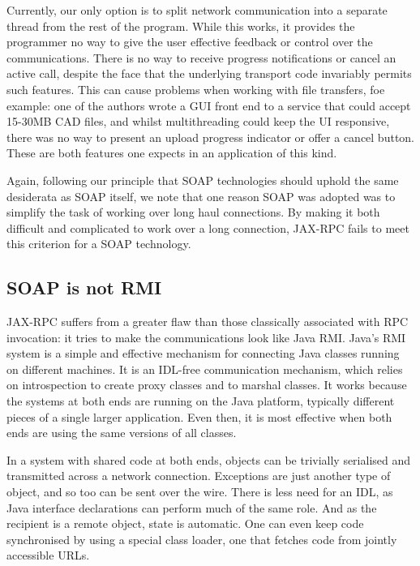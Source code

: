 Currently, our only option is to split network communication into a
separate thread from the rest of the program. While this works, it
provides the programmer no way to give the user effective feedback or
control over the communications. There is no way to receive progress
notifications or cancel an active call, despite the face that the
underlying transport code invariably permits such features. This can
cause problems when working with file transfers, foe example: one of
the authors wrote a GUI front end to a service that could accept
15-30MB CAD files, and whilst multithreading could keep the UI
responsive, there was no way to present an upload progress indicator
or offer a cancel button. These are both features one expects in an
application of this kind.

Again, following our principle that SOAP technologies should uphold
the same desiderata as SOAP itself, we note that one reason SOAP was
adopted was to simplify the task of working over long haul
connections. By making it both difficult and complicated to work over
a long connection, JAX-RPC fails to meet this criterion for a SOAP
technology.

\subsection{SOAP is not RMI}
\label{objections:soap-not-rmi}

JAX-RPC suffers from a greater flaw than those classically associated
with RPC invocation: it tries to make the communications look like
Java RMI. Java's RMI system is a simple and effective mechanism for
connecting Java classes running on different machines. It is an
IDL-free communication mechanism, which relies on introspection to
create proxy classes and to marshal classes. It works because the
systems at both ends are running on the Java platform, typically
different pieces of a single larger application. Even then, it is
most effective when both ends are using the same versions of all
classes.

In a system with shared code at both ends,
objects can be trivially serialised and transmitted across a
network connection. Exceptions are just another type of object, and
so too can be sent over the wire. There is less need for an IDL, as Java
interface declarations can perform much of the same role. And as the
recipient is a remote object, state is automatic. One can even keep
code synchronised by using a special class loader, one that fetches
code from jointly accessible URLs.

